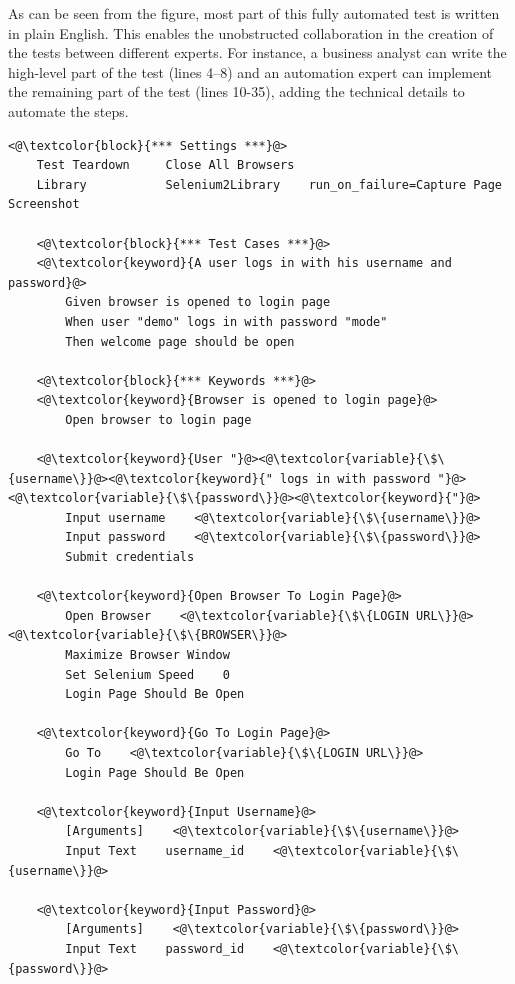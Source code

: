 As can be seen from the figure, most part of this fully automated test is written in plain English. This enables the unobstructed collaboration in the creation of the tests between different experts. For instance, a business analyst can write the high-level part of the test (lines 4--8) and an automation expert can implement the remaining part of the test (lines 10-35), adding the technical details to automate the steps.

\begin{lstlisting}[caption={Example of Robot Framework test}, label={lst:robot}]
    <@\textcolor{block}{*** Settings ***}@>
    Test Teardown     Close All Browsers
    Library           Selenium2Library    run_on_failure=Capture Page Screenshot
    
    <@\textcolor{block}{*** Test Cases ***}@>
    <@\textcolor{keyword}{A user logs in with his username and password}@>
        Given browser is opened to login page
        When user "demo" logs in with password "mode"
        Then welcome page should be open
    
    <@\textcolor{block}{*** Keywords ***}@>
    <@\textcolor{keyword}{Browser is opened to login page}@>
        Open browser to login page
    
    <@\textcolor{keyword}{User "}@><@\textcolor{variable}{\$\{username\}}@><@\textcolor{keyword}{" logs in with password "}@><@\textcolor{variable}{\$\{password\}}@><@\textcolor{keyword}{"}@>
        Input username    <@\textcolor{variable}{\$\{username\}}@>
        Input password    <@\textcolor{variable}{\$\{password\}}@>
        Submit credentials
    
    <@\textcolor{keyword}{Open Browser To Login Page}@>
        Open Browser    <@\textcolor{variable}{\$\{LOGIN URL\}}@>    <@\textcolor{variable}{\$\{BROWSER\}}@>
        Maximize Browser Window
        Set Selenium Speed    0
        Login Page Should Be Open        
    
    <@\textcolor{keyword}{Go To Login Page}@>
        Go To    <@\textcolor{variable}{\$\{LOGIN URL\}}@>
        Login Page Should Be Open
    
    <@\textcolor{keyword}{Input Username}@>
        [Arguments]    <@\textcolor{variable}{\$\{username\}}@>
        Input Text    username_id    <@\textcolor{variable}{\$\{username\}}@>
    
    <@\textcolor{keyword}{Input Password}@>
        [Arguments]    <@\textcolor{variable}{\$\{password\}}@>
        Input Text    password_id    <@\textcolor{variable}{\$\{password\}}@>
    

\end{lstlisting}
